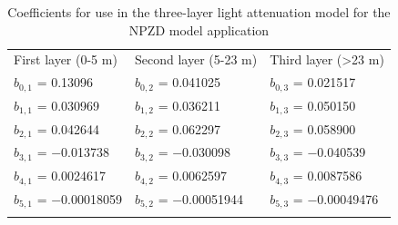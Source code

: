 \documentclass[gmd, manuscript]{copernicus}
\begin{document}

















\appendix

%
\appendixtables
\begin{table}[t]
\caption{Coefficients for use in the three-layer light attenuation model for the NPZD model application}
\begin{tabular}{l l l}
\tophline
First layer (0-5 m) & Second layer (5-23 m) & Third layer (>23 m)\\
\middlehline

$b_{0,1}$ = 0.13096 & $b_{0,2}$ = 0.041025 & $b_{0,3}$ = 0.021517 \\

$b_{1,1}$ = 0.030969 & $b_{1,2}$ = 0.036211 & $b_{1,3}$ = 0.050150 \\

$b_{2,1}$ = 0.042644 & $b_{2,2}$ = 0.062297 & $b_{2,3}$ = 0.058900 \\

$b_{3,1}$ = −0.013738 & $b_{3,2}$ = −0.030098 & $b_{3,3}$ = −0.040539 \\

$b_{4,1}$ = 0.0024617 & $b_{4,2}$ = 0.0062597 & $b_{4,3}$ = 0.0087586 \\

$b_{5,1}$ = −0.00018059 & $b_{5,2}$ = −0.00051944 & $b_{5,3}$ = −0.00049476 \\

\bottomhline
\end{tabular}
\label{Appendix:Table:LightLayerCoefficients}
\end{table}
\end{document}
